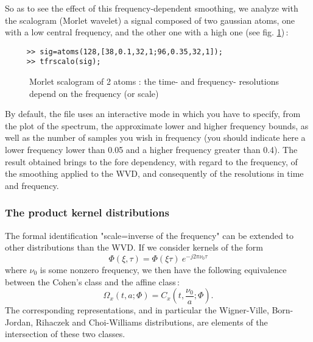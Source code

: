   So as to see the effect of this frequency-dependent smoothing, we analyze
with the scalogram (Morlet wavelet) a signal composed of two gaussian
atoms, one with a low central frequency, and the other one with a high one
(see fig. \ref{En2fig1})\,:
\begin{verbatim}
     >> sig=atoms(128,[38,0.1,32,1;96,0.35,32,1]);
     >> tfrscalo(sig);
\end{verbatim} 
\begin{figure}[htb]
\epsfxsize=10cm
\epsfysize=8cm
\centerline{}
\caption{\label{En2fig1}Morlet scalogram of 2 atoms : the time- and
frequency- resolutions depend on the frequency (or scale)}
\end{figure}
By default, the file  uses
an interactive mode in which you have to specify, from the plot of the
spectrum, the approximate lower and higher frequency bounds, as well as the
number of samples you wish in frequency (you should indicate here a lower
frequency lower than 0.05 and a higher frequency greater than 0.4). The
result obtained brings to the fore dependency, with regard to the
frequency, of the smoothing applied to the WVD, and consequently of the
resolutions in time and frequency.


\subsubsection{The product kernel distributions}
  The formal identification "scale=inverse of the frequency" can be
extended to other distributions than the WVD. If we consider kernels of the
form
\[\Phi(\xi,\tau)=\Phi(\xi \tau)\ e^{-j2\pi\nu_0 \tau}\]
where $\nu_0$ is some nonzero frequency, we then have the following
equivalence between the Cohen's class and the affine class\,:
\[\Omega_x(t,a;\Phi)=C_x\left(t,\frac{\nu_0}{a};\Phi\right).\]
The corresponding representations, and in particular the Wigner-Ville,
Born-Jordan, Rihaczek and Choi-Williams distributions, are elements of the
intersection of these two classes.


